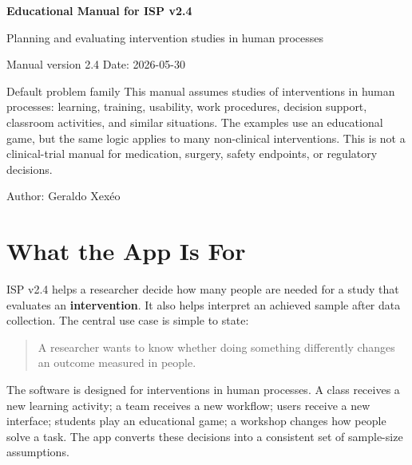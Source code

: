 \documentclass[11pt,a4paper,oneside]{report}
\newcommand{\app}{\textsf{ISP v2.4}\index{ISP v2.4}}
\newcommand{\term}[1]{\textbf{#1}\index{#1}}
\begin{document}
\hypersetup{pageanchor=false}

\begin{titlepage}
  \centering
  \vspace*{1.8cm}
  {\Huge\bfseries\color{ispblue} Educational Manual for \app\par}
  \vspace{0.45cm}
  {\Large Planning and evaluating intervention studies in human processes\par}
  \vspace{1cm}
  {\large Manual version 2.4 \quad Date: 2026-05-30\par}
  \vfill
  \begin{conceptbox}{Default problem family}
  This manual assumes studies of interventions in human processes: learning, training, usability, work procedures, decision support, classroom activities, and similar situations. The examples use an educational game, but the same logic applies to many non-clinical interventions. This is not a clinical-trial manual for medication, surgery, safety endpoints, or regulatory decisions.
  \end{conceptbox}
  \vfill
  {\large Author: Geraldo Xexéo\par}
\end{titlepage}

\clearpage
\hypersetup{pageanchor=true}
\tableofcontents
\clearpage
{}

\chapter{What the App Is For}

\app{} helps a researcher decide how many people are needed for a study that evaluates an \term{intervention}. It also helps interpret an achieved sample after data collection. The central use case is simple to state:

\begin{quote}
  A researcher wants to know whether doing something differently changes an outcome measured in people.
\end{quote}

The software is designed for interventions in human processes. A class receives a new learning activity; a team receives a new workflow; users receive a new interface; students play an educational game; a workshop changes how people solve a task. The app converts these decisions into a consistent set of sample-size assumptions.
\end{document}
